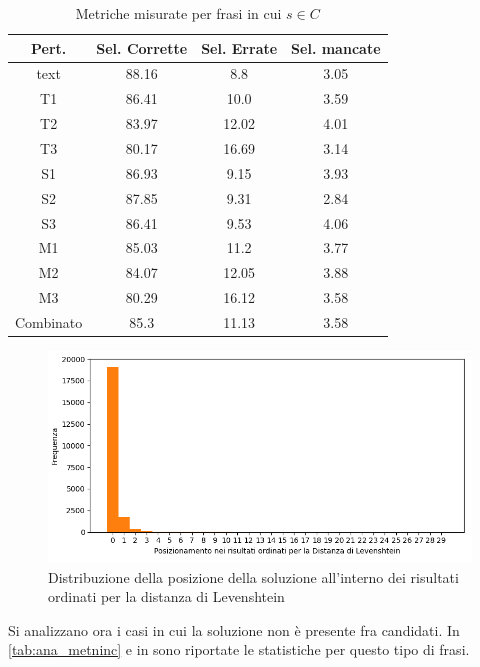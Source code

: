 \begin{table}[H]
\centering
\begin{tabular}{cccc}
\textbf{Pert.} & \textbf{Sel. Corrette} & \textbf{Sel. Errate} & \textbf{Sel. mancate}\\
\hline
text& 88.16& 8.8& 3.05\\
T1& 86.41& 10.0& 3.59\\
T2& 83.97& 12.02& 4.01\\
T3& 80.17& 16.69& 3.14\\
S1& 86.93& 9.15& 3.93\\
S2& 87.85& 9.31& 2.84\\
S3& 86.41& 9.53& 4.06\\
M1& 85.03& 11.2& 3.77\\
M2& 84.07& 12.05& 3.88\\
M3& 80.29& 16.12& 3.58\\
Combinato& 85.3& 11.13& 3.58\\
\end{tabular}
\caption{Metriche misurate per frasi in cui $s \in C$}
\label{tab:ana_metinc}
\end{table}




\begin{figure}[H]
\centering
\includegraphics[width=\textwidth]{immagini/analisi/lev_pos_Combinato}
\caption{Distribuzione della posizione della soluzione all'interno dei risultati ordinati per la distanza di Levenshtein}
\label{fig:ana_levsinc}
\end{figure}

\noindent
Si analizzano ora i casi in cui la soluzione non è presente fra candidati. In \autoref{tab:ana_metninc} e in  sono riportate le statistiche per questo tipo di frasi.

